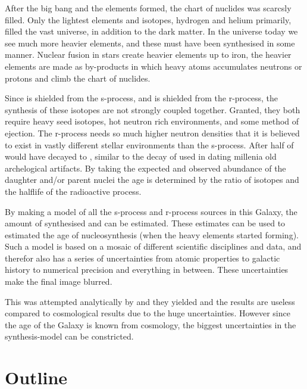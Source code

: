 
After the big bang and the elements formed, the chart of nuclides was scarcsly filled.
Only the lightest elements and isotopes, hydrogen and helium primarily, filled the vast universe\cite{alphabetagamma}, in addition to the dark matter.
In the universe today we see much more heavier elements, and these must have been synthesised in some manner.
Nuclear fusion in stars create heavier elements up to iron, the heavier elements are made as by-products in which heavy atoms accumulates neutrons or protons and climb the chart of nuclides\cite{BBFH}.

Since  is shielded from the s-process, and  is shielded from the r-process, the synthesis of these isotopes are not
strongly coupled together. Granted, they both require heavy seed isotopes, hot neutron rich environments, and some method of ejection. The r-process needs so much higher neutron densities that it is believed to exist in vastly different stellar environments than the s-process.
After  half of  would have decayed to , similar to the decay of  used in dating millenia old archelogical artifacts.
By taking the expected and observed abundance of the daughter and/or parent nuclei the age is determined by the ratio of isotopes and the halflife of the radioactive process.

By making a model of all the s-process and r-process sources in this Galaxy, the amount of synthesised  and  can be estimated. These estimates can be used to estimated the age of nucleosynthesis (when the heavy elements started forming).
Such a model is based on a mosaic of different scientific disciplines and data, and therefor also has a series of uncertainties from atomic properties to galactic history to numerical precision and everything in between. These uncertainties make the final image blurred.

This was attempted analytically by  and they yielded  and the results are useless compared to cosmological results  due to the huge uncertainties. However since the age of the Galaxy is known from cosmology, the biggest uncertainties in the synthesis-model can be constricted.

\section{Outline}

